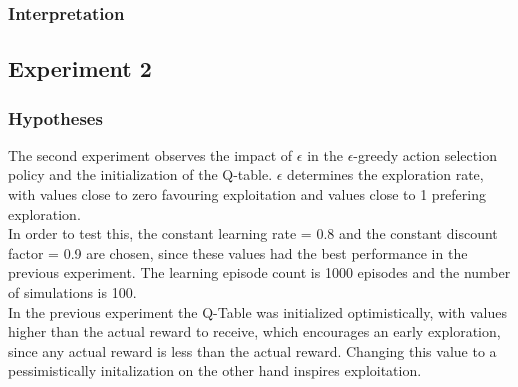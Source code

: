 \documentclass[11pt]{article}
\begin{document}
\subsubsection{Interpretation}


\subsubsection{}

\subsection{Experiment 2}

\subsubsection{Hypotheses}
The second experiment observes the impact of $\epsilon$ in the $\epsilon$-greedy action selection policy and the initialization of the Q-table. $\epsilon$ determines the exploration rate, with values close to zero favouring exploitation and values close to 1 prefering exploration.\\
In order to test this, the constant learning rate = 0.8 and the constant discount factor = 0.9 are chosen, since these values had the best performance in the previous experiment. The learning episode count is 1000 episodes and the number of simulations is 100.\\
In the previous experiment the Q-Table was initialized optimistically, with values higher than the actual reward to receive, which encourages an early exploration, since any actual reward is less than the actual reward. Changing this value to a pessimistically initalization on the other hand inspires exploitation.
\end{document}
